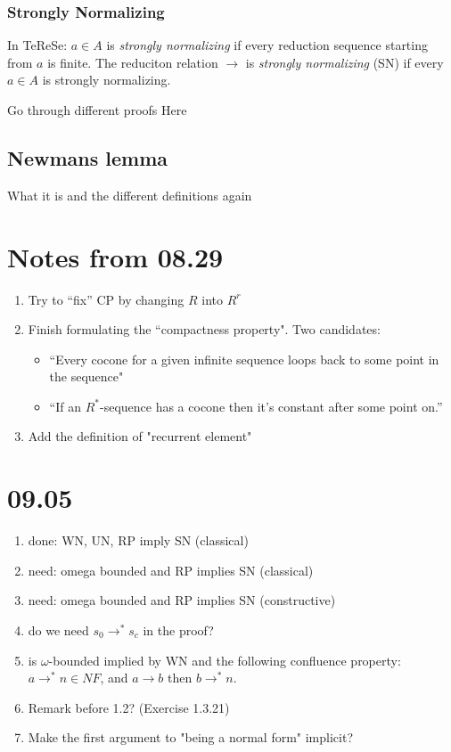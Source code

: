\documentclass{scrartcl}
\begin{document}
\subsubsection{Strongly Normalizing}
\begin{center}
    In TeReSe: $a \in A$ is \textit{strongly normalizing} if every reduction sequence starting from $a$ is finite. The reduciton relation $\rightarrow$ is \textit{strongly normalizing} (SN) if every $a \in A$ is strongly normalizing.
\end{center}
Go through different proofs Here

\subsection{Newmans lemma}
What it is and the different definitions again

\subsection{}

\section{Notes from 08.29}

\begin{enumerate}
  \item Try to ``fix'' CP by changing $R$ into $R^r$
  \item Finish formulating the ``compactness property".  Two candidates:
  \begin{itemize}
    \item ``Every cocone for a given infinite sequence loops back to some point in the sequence"
    \item ``If an $R^*$-sequence has a cocone then it's constant after some point on.''
  \end{itemize}
  \item Add the definition of "recurrent element"
\end{enumerate}

\section{09.05}
\begin{enumerate}
  \item done: WN, UN, RP imply SN (classical)
  \item need: omega bounded and RP implies SN (classical)
  \item need: omega bounded and RP implies SN (constructive)
  \item do we need $s_0 \to^* s_c$ in the proof?
  \item is $\omega$-bounded implied by WN and the following confluence property:
  $a \to^* n \in NF$, and $a \to b$ then $b \to^* n $.
  \item Remark before 1.2? (Exercise 1.3.21)
  \item Make the first argument to "being a normal form" implicit?
\end{enumerate}
\end{document}
